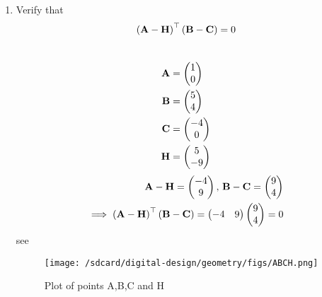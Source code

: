 \documentclass[11pt]{book}
\begin{document}
\begin{enumerate}[label=\thesection.\arabic*.,ref=\thesection.\theenumi]
\item Verify that 
		\begin{align}
			\left(\mathbf{A}-\mathbf{H}\right)^{\top}\left(\mathbf{B}-\mathbf{C}\right) = 0
		\end{align}
\\  \solution
 \begin{align} 
 \mathbf{A} &= \begin{pmatrix} 1\\ 0 \end{pmatrix} \\ 
 \mathbf{B} &= \begin{pmatrix} 5\\ 4 \end{pmatrix}
  \\\mathbf{C} &= \begin{pmatrix} -4\\ 0\end{pmatrix} \\ 
  \mathbf{H} &=\begin{pmatrix}{5}\\{-9}\end{pmatrix}
 \end{align}
\begin{align}
\mathbf{A}-\mathbf{H}=\begin{pmatrix}{-4}\\{9}\end{pmatrix},\,
\mathbf{B}-\mathbf{C}=\begin{pmatrix}9\\4\end{pmatrix}
\\
	\implies \left(\mathbf{A}-\mathbf{H}\right)^{\top}\left(\mathbf{B}-\mathbf{C}\right)=\begin{pmatrix}-4 & 9\end{pmatrix}
\begin{pmatrix}9\\4\end{pmatrix}
=0
\end{align}
see 
\begin{figure}
    \centering
    \texttt{[image: /sdcard/digital-design/geometry/figs/ABCH.png]}
    \caption{Plot of points A,B,C and H}
    \label{fig:Pts_ABCH}
\end{figure}



\end{enumerate}
\end{document}

